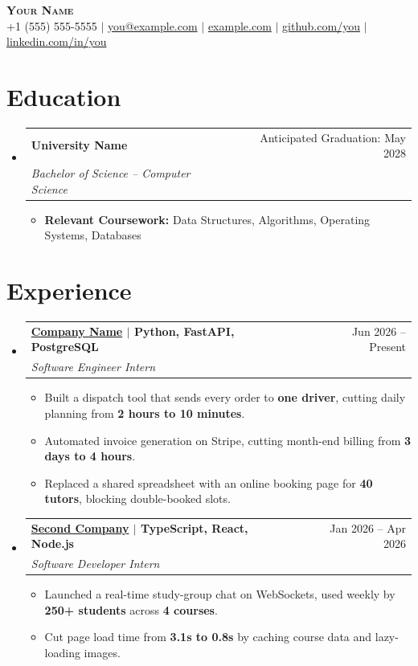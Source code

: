 \documentclass[letterpaper,11pt]{article}
\makeatletter
\newcommand{\resumeItem}[1]{\item\small{{#1 \vspace{-2pt}}}}
\newcommand{\resumeSubheading}[4]{
  \vspace{-2pt}\item
    \begin{tabular*}{0.97\textwidth}[t]{l@{\extracolsep{\fill}}r}
      \textbf{#1} & #2 \\
      \textit{\small#3} & \textit{\small #4} \\
    \end{tabular*}\vspace{-7pt}
}
\newcommand{\resumeSubHeadingListStart}{\begin{itemize}[leftmargin=0.15in, label={}]}
\newcommand{\resumeSubHeadingListEnd}{\end{itemize}}
\newcommand{\resumeItemListStart}{\begin{itemize}}
\newcommand{\resumeItemListEnd}{\end{itemize}\vspace{-5pt}}
\makeatother
\begin{document}
\begin{center}
  \textbf{\Huge \scshape Your Name} \\ \vspace{4pt}
  \small +1 (555) 555-5555 $|$ \href{mailto:you@example.com}{you@example.com} $|$
  \href{https://example.com}{example.com} $|$
  \href{https://github.com/you}{github.com/you} $|$
  \href{https://linkedin.com/in/you}{linkedin.com/in/you}
\end{center}

\section{Education}
\resumeSubHeadingListStart
  \resumeSubheading
    {University Name}{Anticipated Graduation: May 2028}
    {Bachelor of Science -- Computer Science}{}
  \resumeItemListStart
    \resumeItem{\textbf{Relevant Coursework:} Data Structures, Algorithms, Operating Systems, Databases}
  \resumeItemListEnd
\resumeSubHeadingListEnd

\section{Experience}
\resumeSubHeadingListStart
  \resumeSubheading
    {\href{https://example.com}{Company Name} $|$ \textnormal{\small Python, FastAPI, PostgreSQL}}{Jun 2026 -- Present}
    {Software Engineer Intern}{}
  \resumeItemListStart
    \resumeItem{Built a dispatch tool that sends every order to \textbf{one driver}, cutting daily planning from \textbf{2 hours to 10 minutes}.}
    \resumeItem{Automated invoice generation on Stripe, cutting month-end billing from \textbf{3 days to 4 hours}.}
    \resumeItem{Replaced a shared spreadsheet with an online booking page for \textbf{40 tutors}, blocking double-booked slots.}
  \resumeItemListEnd

  \resumeSubheading
    {\href{https://example.com}{Second Company} $|$ \textnormal{\small TypeScript, React, Node.js}}{Jan 2026 -- Apr 2026}
    {Software Developer Intern}{}
  \resumeItemListStart
    \resumeItem{Launched a real-time study-group chat on WebSockets, used weekly by \textbf{250+ students} across \textbf{4 courses}.}
    \resumeItem{Cut page load time from \textbf{3.1s to 0.8s} by caching course data and lazy-loading images.}
  \resumeItemListEnd
\resumeSubHeadingListEnd

\end{document}
